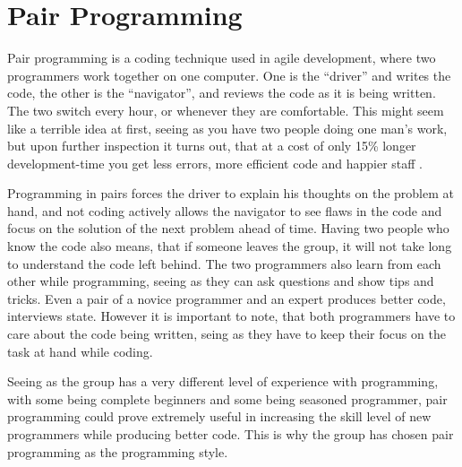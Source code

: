 \section{Pair Programming}
Pair programming is a coding technique used in agile development, where two programmers work together on one computer. 
One is the ``driver'' and writes the code, the other is the ``navigator'', and reviews the code as it is being written. 
The two switch every hour, or whenever they are comfortable. 
This might seem like a terrible idea at first, seeing as you have two people doing one man's work, 
but upon further inspection it turns out, that at a cost of only 15\% longer development-time 
you get less errors, more efficient code and happier staff \cite{cockburn00}. 

Programming in pairs forces the driver to explain his thoughts on the problem at hand, 
and not coding actively allows the navigator to see flaws in the code 
and focus on the solution of the next problem ahead of time. Having two people who know the code also
means, that if someone leaves the group, it will not take long to understand the code left behind.
The two programmers also learn from each other while programming, seeing as they can ask questions and show tips and tricks. Even a pair of a novice programmer and an expert produces better code, interviews state.\cite{cockburn00} However it is important to note, that both programmers have to care about the code being written, seing as they have to keep their focus on the task at hand while coding.

Seeing as the group has a very different level of experience with programming, with some being complete beginners and some being seasoned programmer, pair programming could prove extremely useful in increasing the skill level of new programmers while producing better code. This is why the group has chosen pair programming as the programming style.